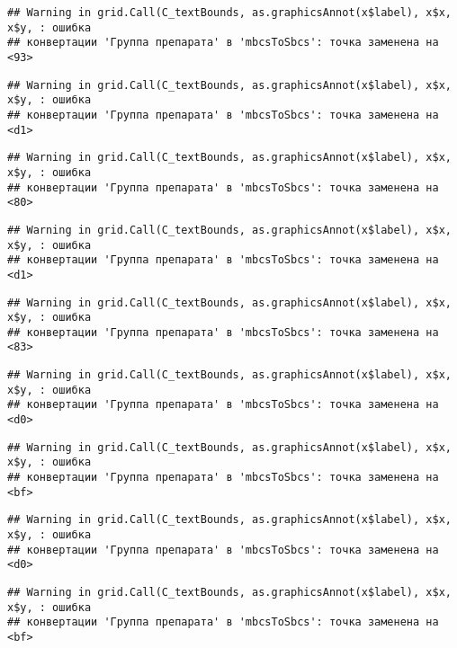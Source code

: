 \documentclass[
]{article}
\begin{document}
\begin{verbatim}
## Warning in grid.Call(C_textBounds, as.graphicsAnnot(x$label), x$x, x$y, : ошибка
## конвертации 'Группа препарата' в 'mbcsToSbcs': точка заменена на <93>
\end{verbatim}

\begin{verbatim}
## Warning in grid.Call(C_textBounds, as.graphicsAnnot(x$label), x$x, x$y, : ошибка
## конвертации 'Группа препарата' в 'mbcsToSbcs': точка заменена на <d1>
\end{verbatim}

\begin{verbatim}
## Warning in grid.Call(C_textBounds, as.graphicsAnnot(x$label), x$x, x$y, : ошибка
## конвертации 'Группа препарата' в 'mbcsToSbcs': точка заменена на <80>
\end{verbatim}

\begin{verbatim}
## Warning in grid.Call(C_textBounds, as.graphicsAnnot(x$label), x$x, x$y, : ошибка
## конвертации 'Группа препарата' в 'mbcsToSbcs': точка заменена на <d1>
\end{verbatim}

\begin{verbatim}
## Warning in grid.Call(C_textBounds, as.graphicsAnnot(x$label), x$x, x$y, : ошибка
## конвертации 'Группа препарата' в 'mbcsToSbcs': точка заменена на <83>
\end{verbatim}

\begin{verbatim}
## Warning in grid.Call(C_textBounds, as.graphicsAnnot(x$label), x$x, x$y, : ошибка
## конвертации 'Группа препарата' в 'mbcsToSbcs': точка заменена на <d0>
\end{verbatim}

\begin{verbatim}
## Warning in grid.Call(C_textBounds, as.graphicsAnnot(x$label), x$x, x$y, : ошибка
## конвертации 'Группа препарата' в 'mbcsToSbcs': точка заменена на <bf>
\end{verbatim}

\begin{verbatim}
## Warning in grid.Call(C_textBounds, as.graphicsAnnot(x$label), x$x, x$y, : ошибка
## конвертации 'Группа препарата' в 'mbcsToSbcs': точка заменена на <d0>
\end{verbatim}

\begin{verbatim}
## Warning in grid.Call(C_textBounds, as.graphicsAnnot(x$label), x$x, x$y, : ошибка
## конвертации 'Группа препарата' в 'mbcsToSbcs': точка заменена на <bf>
\end{verbatim}
\end{document}
